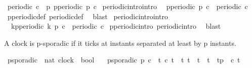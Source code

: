 \begin{isabellebody}
\isamarkupfalse%
\ {\isacartoucheopen}periodic\ c\ {\isasymequiv}\ {\isacharparenleft}{\isasymexists}p{\isachardot}\ p{\isacharunderscore}periodic\ p\ c{\isacharparenright}{\isacartoucheclose}\isanewline
\isanewline
{}\isamarkupfalse%
\ periodic{\isacharunderscore}intro{}{\isacharbrackleft}intro{\isacharbrackright}{\isacharcolon}\isanewline
\ \ {\isacartoucheopen}p{\isacharunderscore}periodic\ p\ c\ {\isasymLongrightarrow}\ periodic\ c{\isacartoucheclose}\isanewline
%
\isadelimproof
%
\endisadelimproof
%
\isatagproof
{}\isamarkupfalse%
\ p{\isacharunderscore}periodic{\isacharunderscore}def\ periodic{\isacharunderscore}def\ \isamarkupfalse%
\ blast%
\endisatagproof
{\isafoldproof}%
%
\isadelimproof
\isanewline
%
\endisadelimproof
\isanewline
{}\isamarkupfalse%
\ periodic{\isacharunderscore}intro{}{\isacharbrackleft}intro{\isacharbrackright}{\isacharcolon}\isanewline
\ \ {\isacartoucheopen}kp{\isacharunderscore}periodic\ k\ p\ c\ {\isasymLongrightarrow}\ periodic\ c{\isacartoucheclose}\isanewline
%
\isadelimproof
%
\endisadelimproof
%
\isatagproof
{}\isamarkupfalse%
\ p{\isacharunderscore}periodic{\isacharunderscore}intro\ periodic{\isacharunderscore}intro{}\ \isamarkupfalse%
\ blast%
\endisatagproof
{\isafoldproof}%
%
\isadelimproof
%
\endisadelimproof
%
\isadelimdocument
%
\endisadelimdocument
%
\isatagdocument
%
\isamarkuptrue%
%
\endisatagdocument
{\isafolddocument}%
%
\isadelimdocument
%
\endisadelimdocument
%
\begin{isamarkuptext}%
A clock is p-sporadic if it ticks at instants separated at least by p instants.%
\end{isamarkuptext}\isamarkuptrue%
\isamarkupfalse%
\ p{\isacharunderscore}sporadic\ {\isacharcolon}{\isacharcolon}\ {\isacartoucheopen}{\isacharbrackleft}nat{\isacharcomma}\ clock{\isacharbrackright}\ {\isasymRightarrow}\ bool{\isacartoucheclose}\isanewline
\ \ \ {\isacartoucheopen}p{\isacharunderscore}sporadic\ p\ c\ {\isasymequiv}\ {\isacharparenleft}{\isasymforall}t{\isachardot}\ c\ t\ {\isasymlongrightarrow}\ {\isacharparenleft}{\isasymforall}t{\isacharprime}{\isachardot}\ {\isacharparenleft}t\ {\isacharless}\ t{\isacharprime}\ {\isasymand}\ t{\isacharprime}\ {\isasymle}\ t{\isacharplus}p{\isacharparenright}\ {\isasymlongrightarrow}\ {\isasymnot}{\isacharparenleft}c\ t{\isacharprime}{\isacharparenright}{\isacharparenright}{\isacharparenright}{\isacartoucheclose}%

\end{isabellebody}
